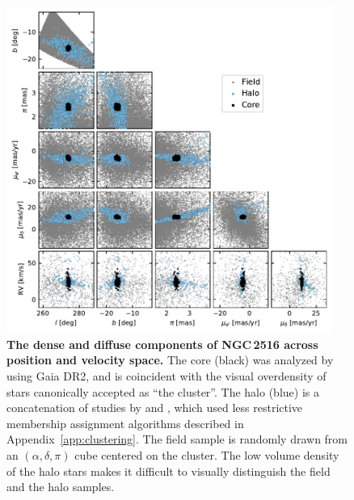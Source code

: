 \documentclass[12pt,twocolumn,tighten]{aastex63}
\begin{document}
\begin{figure}[t]
	\begin{center}
		\leavevmode
		\includegraphics[width=0.95\textwidth]{f1.pdf}
	\end{center}
	\vspace{-0.7cm}
  \caption{ {\bf The dense and diffuse components of NGC\,2516 across
  position and velocity space.} The core (black) was analyzed by
  \citet{cantatgaudin_gaia_2018} using Gaia DR2, and is coincident
  with the visual overdensity of stars canonically accepted as ``the
  cluster''.  The halo (blue) is a concatenation of studies by
  \citet{kounkel_untangling_2019} and \citet{meingast_2021}, which
  used less restrictive membership assignment algorithms described in
  Appendix~\ref{app:clustering}.  The field sample is randomly drawn
  from an $(\alpha, \delta, \pi)$ cube centered on the cluster.  The
  low volume density of the halo stars makes it difficult to visually
  distinguish the field and the halo samples.
  \label{fig:gaia6d}
	}
\end{figure}
\end{document}
